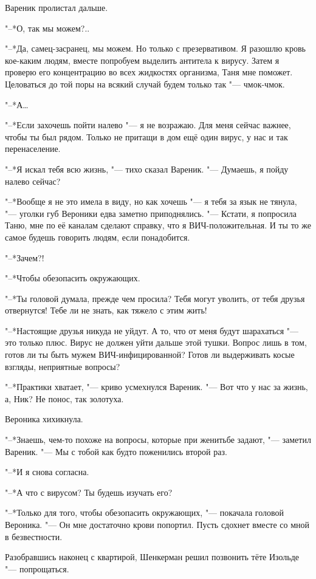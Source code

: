 Вареник пролистал дальше.

"--*О, так мы можем?..

"--*Да, самец-засранец, мы можем.
Но только с презервативом.
Я разошлю кровь кое-каким людям, вместе попробуем выделить антитела к вирусу.
Затем я проверю его концентрацию во всех жидкостях организма, Таня мне поможет.
Целоваться до той поры на всякий случай будем только так "--- чмок-чмок.

"--*А\ldots{}

"--*Если захочешь пойти налево "--- я не возражаю.
Для меня сейчас важнее, чтобы ты был рядом.
Только не притащи в дом ещё один вирус, у нас и так перенаселение.

"--*Я искал тебя всю жизнь, "--- тихо сказал Вареник.
"--- Думаешь, я пойду налево сейчас?

"--*Вообще я не это имела в виду, но как хочешь "--- я тебя за язык не тянула, "--- уголки губ Вероники едва заметно приподнялись.
"--- Кстати, я попросила Таню, мне по её каналам сделают справку, что я ВИЧ-положительная.
И ты то же самое будешь говорить людям, если понадобится.

"--*Зачем?!

"--*Чтобы обезопасить окружающих.

"--*Ты головой думала, прежде чем просила?
Тебя могут уволить, от тебя друзья отвернутся!
Тебе ли не знать, как тяжело с этим жить!

"--*Настоящие друзья никуда не уйдут.
А то, что от меня будут шарахаться "--- это только плюс.
Вирус не должен уйти дальше этой тушки.
Вопрос лишь в том, готов ли ты быть мужем ВИЧ-инфицированной?
Готов ли выдерживать косые взгляды, неприятные вопросы?

"--*Практики хватает, "--- криво усмехнулся Вареник.
"--- Вот что у нас за жизнь, а, Ник?
Не понос, так золотуха.

Вероника хихикнула.

"--*Знаешь, чем-то похоже на вопросы, которые при женитьбе задают, "--- заметил Вареник.
"--- Мы с тобой как будто поженились второй раз.

"--*И я снова согласна.

"--*А что с вирусом?
Ты будешь изучать его?

"--*Только для того, чтобы обезопасить окружающих, "--- покачала головой Вероника.
"--- Он мне достаточно крови попортил.
Пусть сдохнет вместе со мной в безвестности.

\asterism

Разобравшись наконец с квартирой, Шенкерман решил позвонить тёте Изольде "--- попрощаться.

